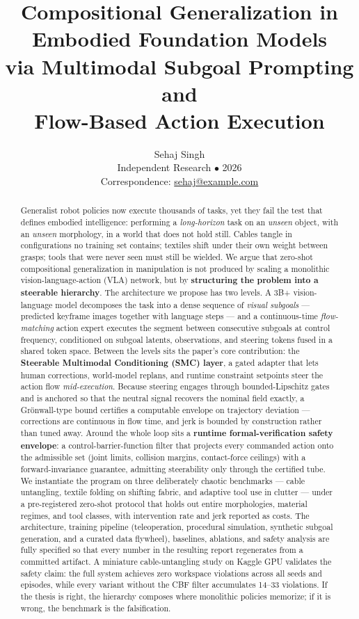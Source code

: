 \documentclass[11pt,a4paper]{article}
\title{\bfseries Compositional Generalization in Embodied Foundation Models\\[2pt]
via Multimodal Subgoal Prompting and\\[2pt]
Flow-Based Action Execution}
\author{Sehaj Singh\\[2pt]
\small Independent Research $\bullet$ 2026\\[2pt]
\small Correspondence: \url{sehaj@example.com}}
\date{}
\begin{document}
\maketitle

\begin{abstract}
\noindent
Generalist robot policies now execute thousands of tasks, yet they fail the test
that defines embodied intelligence: performing a \emph{long-horizon} task on an
\emph{unseen} object, with an \emph{unseen} morphology, in a world that does not
hold still. Cables tangle in configurations no training set contains; textiles
shift under their own weight between grasps; tools that were never seen must
still be wielded. We argue that zero-shot compositional generalization in
manipulation is not produced by scaling a monolithic vision-language-action (VLA)
network, but by \textbf{structuring the problem into a steerable hierarchy}. The
architecture we propose has two levels. A 3B+ vision-language model decomposes the
task into a dense sequence of \emph{visual subgoals} --- predicted keyframe images
together with language steps --- and a continuous-time \emph{flow-matching}
action expert executes the segment between consecutive subgoals at control
frequency, conditioned on subgoal latents, observations, and steering tokens fused
in a shared token space. Between the levels sits the paper's core contribution:
the \textbf{Steerable Multimodal Conditioning (SMC) layer}, a gated adapter that
lets human corrections, world-model replans, and runtime constraint setpoints
steer the action flow \emph{mid-execution}. Because steering engages through
bounded-Lipschitz gates and is anchored so that the neutral signal recovers the
nominal field exactly, a Gr\"onwall-type bound certifies a computable envelope on
trajectory deviation --- corrections are continuous in flow time, and jerk is
bounded by construction rather than tuned away. Around the whole loop sits a
\textbf{runtime formal-verification safety envelope}: a control-barrier-function
filter that projects every commanded action onto the admissible set (joint limits,
collision margins, contact-force ceilings) with a forward-invariance guarantee,
admitting steerability only through the certified tube. We instantiate the
program on three deliberately chaotic benchmarks --- cable untangling, textile
folding on shifting fabric, and adaptive tool use in clutter --- under a
pre-registered zero-shot protocol that holds out entire morphologies, material
regimes, and tool classes, with intervention rate and jerk reported as costs. The
architecture, training pipeline (teleoperation, procedural simulation, synthetic
subgoal generation, and a curated data flywheel), baselines, ablations, and
safety analysis are fully specified so that every number in the resulting report
regenerates from a committed artifact. A miniature cable-untangling study on
Kaggle GPU validates the safety claim: the full system achieves zero workspace
violations across all seeds and episodes, while every variant without the CBF
filter accumulates 14--33 violations. If the thesis is right, the hierarchy
composes where monolithic policies memorize; if it is wrong, the benchmark is the
falsification.
\end{abstract}
\end{document}
